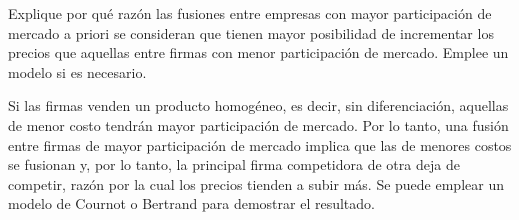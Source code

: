 \question Explique por qué razón las fusiones entre empresas con mayor participación de mercado a priori se consideran que tienen mayor posibilidad de incrementar los precios que aquellas entre firmas con menor participación de mercado. Emplee un modelo si es necesario.
\begin{solution}
Si las firmas venden un producto homogéneo, es decir, sin diferenciación, aquellas de menor costo tendrán mayor participación de mercado. Por lo tanto, una fusión entre firmas de mayor participación de mercado implica que las de menores costos se fusionan y, por lo tanto, la principal firma competidora de otra deja de competir, razón por la cual los precios tienden a subir más. Se puede emplear un modelo de Cournot o Bertrand para demostrar el resultado.

\end{solution}

